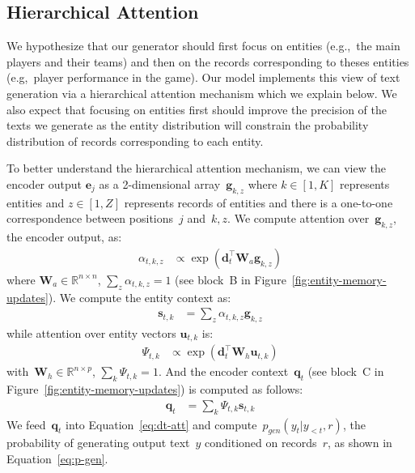 \documentclass[11pt,a4paper]{article}
\begin{document}
\subsection{Hierarchical Attention}
\label{sec:hier-attent}

We hypothesize that our generator should first focus on entities
(e.g.,~the main players and their teams) and then on the records
corresponding to theses entities (e.g,~player performance in the
game). Our model implements this view of text generation via a
hierarchical attention mechanism which we explain below. We also
expect that focusing on entities first should improve the precision of
the texts we generate as the entity distribution will constrain the
probability distribution of records corresponding to each entity.

To better understand the hierarchical attention mechanism, we can view
the encoder output $\mathbf{e}_j$ as a 2-dimensional
array~$\mathbf{g}_{k,z}$ where \mbox{$k\in [1,K]$} represents entities
and $z\in [1,Z]$ represents records of entities and there is a
one-to-one correspondence between positions~$j$ and~${k,z}$.  We
compute attention over~$\mathbf{g}_{k,z}$, the encoder output, as:
\begin{align}
\alpha_{t,k,z} &\propto \exp (\mathbf{d}_t^\intercal \mathbf{W}_a \mathbf{g}_{k,z}) \label{eq:alpha-attention}
\end{align}
where $\mathbf{W}_a \in \mathbb{R}^{n \times n}$,
$\sum_{z} \alpha_{t,k,z} = 1$ (see block~B in
Figure~\ref{fig:entity-memory-updates}).  We compute the entity
context as:
\begin{align}
\mathbf{s}_{t,k} &= \sum_z \alpha_{t,k,z} \mathbf{g}_{k,z} \label{eq:entity-context}
\end{align}
while  attention over entity vectors $\mathbf{u}_{t,k}$ is:
\begin{align}
\Psi_{t,k} &\propto \exp (\mathbf{d}_t^\intercal \mathbf{W}_h \mathbf{u}_{t,k}) \label{eq:psi:attention}
\end{align}
with~$\mathbf{W}_h \in \mathbb{R}^{n \times p}$,
 $\sum_{k} \Psi_{t,k} = 1$.
And the encoder context~$\mathbf{q}_t$ (see block~C in
 Figure~\ref{fig:entity-memory-updates}) is computed as follows:
\begin{align}
\mathbf{q}_t &= \sum_k \Psi_{t,k} \mathbf{s}_{t,k} \label{eq:qt-value-memory}
\end{align}
We feed~$\mathbf{q}_t$ into Equation~\eqref{eq:dt-att} and
compute~$p_{gen} (y_t | y_{<t},r)$, the probability of generating
output text~$y$ conditioned on records~$r$, as shown in
Equation~\eqref{eq:p-gen}.
\end{document}
